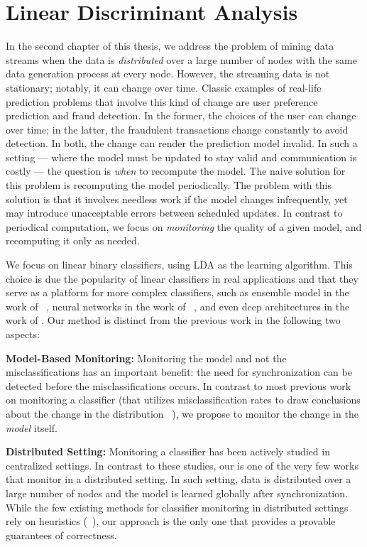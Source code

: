 \section{Linear Discriminant Analysis}
\label{LDAIntro}
In the second chapter of this thesis, we address the problem of mining data streams when the data 
is \textit{distributed} over a large number of nodes with the same data generation process at every node. However, the streaming data is not stationary; notably, it can change over time. Classic examples of real-life prediction problems that involve this kind of change are user preference prediction and fraud detection. In the former, the choices of the user can change over time; in the latter, the fraudulent transactions change constantly to avoid detection. In both, the change can render the prediction model invalid.
In such a setting --- where the model must be updated to stay valid and communication is costly --- the question is \textit{when} to recompute the model. The naive solution for this problem is recomputing the model periodically. The problem with this solution is that it involves needless work if the model changes infrequently, yet may introduce unacceptable errors between scheduled updates. 
In contrast to periodical computation, we focus on \textit{monitoring} the quality of a given model, and recomputing it only as needed. 
\par We focus on linear binary classifiers, using LDA \cite{fisher1936use} as the learning algorithm. This choice is due the popularity of linear classifiers in real applications and that they serve as a platform for more complex classifiers, such as ensemble model in the work of ~\cite{Deva, eSVM}, neural networks in the work of ~\cite{osadchy2015k}, 
and even deep architectures in the work of \cite{ROSS}. Our method is distinct from the previous work in the following two aspects:

\noindent \textbf{Model-Based Monitoring:} 
Monitoring the model and not the misclassifications has an important benefit: the need for synchronization can be detected before the misclassifications occurs. In contrast to most previous work on monitoring a classifier (that utilizes misclassification rates to draw conclusions about the change in the distribution ~\cite{baena2006early, gama2004learning, nishida2007detecting}), we propose to monitor the change in the \textit{model} itself.

\noindent \textbf{Distributed Setting:} Monitoring a classifier has been actively studied in centralized settings. In contrast to these studies, our is one of the very few works that monitor in a distributed setting. In such setting, data is distributed over a large number of nodes and the model is learned globally after synchronization. While the few existing methods for classifier monitoring in distributed settings rely on heuristics (~\cite{AngGZPH13}), our approach is the only one that provides a provable guarantees of correctness.

